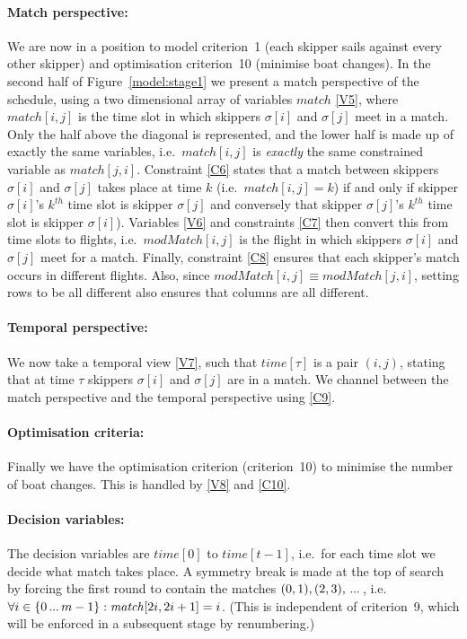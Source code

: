 \documentclass{llncs}
\newcommand{\match}{\mathit{match}}
\newcommand{\modMatch}{\mathit{modMatch}}
\newcommand{\timeVar}{\mathit{time}}
\newcommand\nldots{\,\hbox to 0.8em{.\hss.\hss.}\,}
\begin{document}
\paragraph{Match perspective:} We are now in a position to model criterion~1 (each skipper sails
against every other skipper) and optimisation criterion~10 (minimise boat changes).  In the second
half of Figure~\ref{model:stage1} we present a match perspective of the schedule, using a two
dimensional array of variables $\match$ \eqref{V5}, where $\match[{i,j}]$ is the time slot in which
skippers $\sigma[{i}]$ and $\sigma[{j}]$ meet in a match. Only the half above the diagonal is
represented, and the lower half is made up of exactly the same variables, i.e.\ $\match[{i,j}]$ is
\emph{exactly} the same constrained variable as $\match[{j,i}]$. Constraint \eqref{C6} states that
a match between skippers $\sigma[{i}]$ and $\sigma[{j}]$ takes place at time $k$ (i.e.\
$\match[{i,j}] = k$) if and only if  skipper $\sigma[{i}]$'s $k^{th}$ time slot is skipper
$\sigma[{j}]$ and conversely that skipper $\sigma[{j}]$'s $k^{th}$ time slot is skipper
$\sigma[{i}]$). Variables \eqref{V6} and constraints \eqref{C7} then convert this from time slots to
flights, i.e.\ $\modMatch[{i,j}]$ is the flight in which skippers $\sigma[{i}]$ and $\sigma[{j}]$
meet for a match. Finally, constraint \eqref{C8} ensures that each skipper's match occurs in
different flights. Also, since $\modMatch[{i,j}] \equiv \modMatch[{j,i}]$, setting rows to be all
different also ensures that columns are all different.

\paragraph{Temporal perspective:} We now take a temporal view \eqref{V7}, such that
$\timeVar[{\tau}]$ is a pair $(i,j)$, stating that at time $\tau$ skippers $\sigma[{i}]$ and
$\sigma[{j}]$ are in a match. We channel between the match perspective and the temporal perspective
using \eqref{C9}.

\paragraph{Optimisation criteria:} Finally we have the optimisation criterion (criterion~10) to
minimise the number of boat changes. This is handled by \eqref{V8} and \eqref{C10}.

\paragraph{Decision variables:} The decision variables are $\timeVar[{0}]$ to $\timeVar[{t-1}]$,
i.e.\ for each time slot we decide what match takes place. A symmetry break is made at the top of
search by forcing the first round to contain the matches $(0,1), (2,3), \nldots$, i.e.\ $\forall i
\in \{0 \nldots {m-1}\} : \match[{2i, 2i+1}] = i$. (This is independent of criterion~9, which will
be enforced in a subsequent stage by renumbering.)
\end{document}
